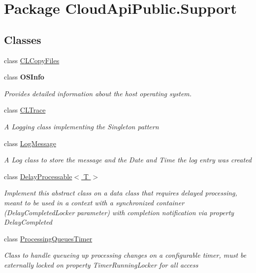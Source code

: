 \hypertarget{namespace_cloud_api_public_1_1_support}{\section{Package Cloud\-Api\-Public.\-Support}
\label{namespace_cloud_api_public_1_1_support}
}
\subsection*{Classes}
\begin{DoxyCompactItemize}
\item 
class \hyperlink{class_cloud_api_public_1_1_support_1_1_c_l_copy_files}{C\-L\-Copy\-Files}
\item 
class {\bfseries O\-S\-Info}
\begin{DoxyCompactList}\small\item\em Provides detailed information about the host operating system. \end{DoxyCompactList}\item 
class \hyperlink{class_cloud_api_public_1_1_support_1_1_c_l_trace}{C\-L\-Trace}
\begin{DoxyCompactList}\small\item\em A Logging class implementing the Singleton pattern \end{DoxyCompactList}\item 
class \hyperlink{class_cloud_api_public_1_1_support_1_1_log_message}{Log\-Message}
\begin{DoxyCompactList}\small\item\em A Log class to store the message and the Date and Time the log entry was created \end{DoxyCompactList}\item 
class \hyperlink{class_cloud_api_public_1_1_support_1_1_delay_processable_3_01_t_01_4}{Delay\-Processable$<$ T $>$}
\begin{DoxyCompactList}\small\item\em Implement this abstract class on a data class that requires delayed processing, meant to be used in a context with a synchronized container (Delay\-Completed\-Locker parameter) with completion notification via property Delay\-Completed \end{DoxyCompactList}\item 
class \hyperlink{class_cloud_api_public_1_1_support_1_1_processing_queues_timer}{Processing\-Queues\-Timer}
\begin{DoxyCompactList}\small\item\em Class to handle queueing up processing changes on a configurable timer, must be externally locked on property Timer\-Running\-Locker for all access \end{DoxyCompactList}\end{DoxyCompactItemize}
